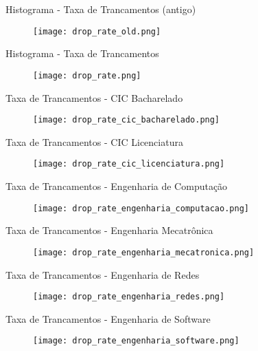 \begin{frame}{Histograma - Taxa de Trancamentos (antigo)}
    \begin{figure}[!ht]
    \centering
    \texttt{[image: drop\_rate\_old.png]}
    \end{figure}
\end{frame}

\begin{frame}{Histograma - Taxa de Trancamentos}
    \begin{figure}[!ht]
    \centering
    \texttt{[image: drop\_rate.png]}
    \end{figure}
\end{frame}

\begin{frame}{Taxa de Trancamentos - CIC Bacharelado}
    \begin{figure}[!ht]
    \centering
    \texttt{[image: drop\_rate\_cic\_bacharelado.png]}
    \end{figure}
\end{frame}

\begin{frame}{Taxa de Trancamentos - CIC Licenciatura}
    \begin{figure}[!ht]
    \centering
    \texttt{[image: drop\_rate\_cic\_licenciatura.png]}
    \end{figure}
\end{frame}

\begin{frame}{Taxa de Trancamentos - Engenharia de Computação}
    \begin{figure}[!ht]
    \centering
    \texttt{[image: drop\_rate\_engenharia\_computacao.png]}
    \end{figure}
\end{frame}

\begin{frame}{Taxa de Trancamentos - Engenharia Mecatrônica}
    \begin{figure}[!ht]
    \centering
    \texttt{[image: drop\_rate\_engenharia\_mecatronica.png]}
    \end{figure}
\end{frame}

\begin{frame}{Taxa de Trancamentos - Engenharia de Redes}
    \begin{figure}[!ht]
    \centering
    \texttt{[image: drop\_rate\_engenharia\_redes.png]}
    \end{figure}
\end{frame}

\begin{frame}{Taxa de Trancamentos - Engenharia de Software}
    \begin{figure}[!ht]
    \centering
    \texttt{[image: drop\_rate\_engenharia\_software.png]}
    \end{figure}
\end{frame}

